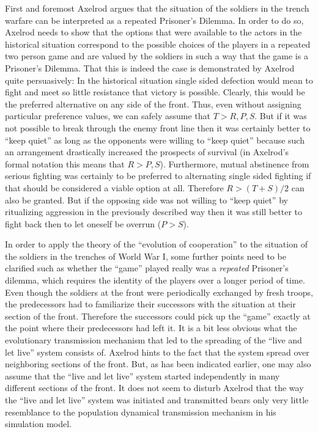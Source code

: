 First and foremost Axelrod argues that the situation of the soldiers in
the trench warfare can be interpreted as a repeated Prisoner's Dilemma. In
order to do so, Axelrod needs to show that the options that were
available to the actors in the historical situation correspond to the
possible choices of the players in a repeated two person game and are
valued by the soldiers in such a way that the game is a Prisoner's
Dilemma. That this is indeed the case is demonstrated by Axelrod quite
persuasively: In the historical situation single sided defection would
mean to fight and meet so little resistance that victory is possible.
Clearly, this would be the preferred alternative on any side of the
front. Thus, even without assigning particular preference values, we
can safely assume that $T > R,P,S$. But if it was not possible to
break through the enemy front line then it was certainly better to
``keep quiet'' as long as the opponents were willing to ``keep quiet''
because such an arrangement drastically increased the prospects of
survival (in Axelrod's formal notation this means that $R > P,S$).
Furthermore, mutual abstinence from serious fighting was certainly to
be preferred to alternating single sided fighting if that should be
considered a viable option at all. Therefore $R > (T+S)/2$ can also be
granted. But if the opposing side was not willing to ``keep quiet'' by
ritualizing aggression in the previously described way then it was
still better to fight back then to let oneself be overrun ($P > S$). 

In order to apply the theory of the ``evolution of cooperation'' to the
situation of the soldiers in the trenches of World War I, some further points
need to be clarified such as whether the ``game'' played really was a {\em
  repeated} Prisoner's dilemma, which requires the identity of the players
over a longer period of time. Even though the soldiers at the front were
periodically exchanged by fresh troops, the predecessors had to familiarize
their successors with the situation at their section of the front. Therefore the
successors could pick up the ``game'' exactly at the point where their
predecessors had left it. It is a bit less obvious what the evolutionary
transmission mechanism that led to the spreading of the ``live and let live''
system consists of. Axelrod hints to the fact that the system spread over
neighboring sections of the front.  But, as has been indicated earlier, one
may also assume that the ``live and let live'' system started independently in
many different sections of the front. It does not seem to disturb Axelrod that
the way the ``live and let live'' system was initiated and transmitted bears
only very little resemblance to the population dynamical transmission
mechanism in his simulation model.

